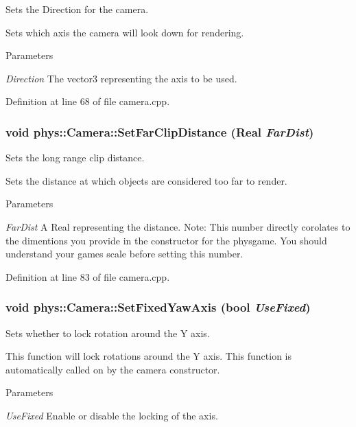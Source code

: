 Sets the Direction for the camera. 

Sets which axis the camera will look down for rendering. 
\begin{DoxyParams}{Parameters}
\item[{\em Direction}]The vector3 representing the axis to be used. \end{DoxyParams}


Definition at line 68 of file camera.cpp.

\hypertarget{classphys_1_1Camera_a25408db8110ac5035fafbd58a5b1106d}{
\subsubsection[{SetFarClipDistance}]{\setlength{\rightskip}{0pt plus 5cm}void phys::Camera::SetFarClipDistance ({\bf Real} {\em FarDist})}}
\label{d9/df8/classphys_1_1Camera_a25408db8110ac5035fafbd58a5b1106d}


Sets the long range clip distance. 

Sets the distance at which objects are considered too far to render. 
\begin{DoxyParams}{Parameters}
\item[{\em FarDist}]A Real representing the distance. Note: This number directly corolates to the dimentions you provide in the constructor for the physgame. You should understand your games scale before setting this number. \end{DoxyParams}


Definition at line 83 of file camera.cpp.

\hypertarget{classphys_1_1Camera_a1b4d5be85c528541c7a1cbebb41bfd89}{
\subsubsection[{SetFixedYawAxis}]{\setlength{\rightskip}{0pt plus 5cm}void phys::Camera::SetFixedYawAxis (bool {\em UseFixed})}}
\label{d9/df8/classphys_1_1Camera_a1b4d5be85c528541c7a1cbebb41bfd89}


Sets whether to lock rotation around the Y axis. 

This function will lock rotations around the Y axis. This function is automatically called on by the camera constructor. 
\begin{DoxyParams}{Parameters}
\item[{\em UseFixed}]Enable or disable the locking of the axis. \end{DoxyParams}


